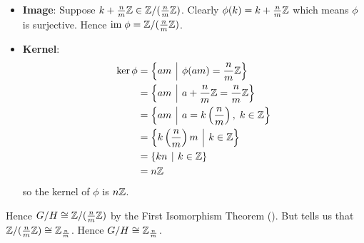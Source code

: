 \begin{questions}
\begin{itemize}
        \item \textbf{Image}: Suppose $k + \frac nm \mathbb{Z} \in \mathbb{Z}/(\frac nm \mathbb{Z})$. Clearly $\phi(k) = k + \frac nm \mathbb{Z}$ which means $\phi$ is surjective. Hence $\mathrm{im}\;\phi = \mathbb{Z}/(\frac nm \mathbb{Z})$.

        \item \textbf{Kernel}:
        \begin{align*}
            \ker\phi &= \left\{am \vert \phi(am) = \frac nm \Z\right\}\\
            &= \left\{am \vert a + \frac nm \Z = \frac nm \Z\right\}\\
            &= \left\{am \vert a  = k\left(\frac nm\right),\; k \in \Z\right\}\\
            &= \left\{k\left(\frac nm\right)m \vert k \in \Z\right\}\\
            &= \{kn \vert k \in \Z\}\\
            &= n\Z
        \end{align*}
        so the kernel of $\phi$ is $n\mathbb{Z}$.
    \end{itemize}
    Hence $G/H \cong \mathbb{Z}/(\frac nm \mathbb{Z})$ by the First Isomorphism Theorem (). But  tells us that $\mathbb{Z}/(\frac nm \mathbb{Z}) \cong \mathbb{Z}_{\frac nm}$. Hence $G/H \cong \mathbb{Z}_{\frac nm}$.
\end{questions}
